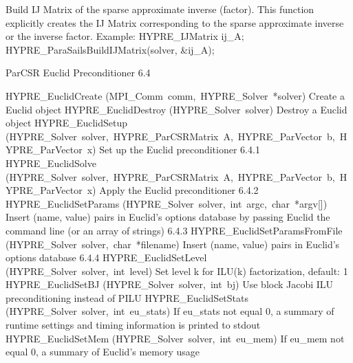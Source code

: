 \documentclass{article}
\begin{document}
\begin{cxxentry}
\begin{cxxentry}
\begin{cxxfunction}
\begin{cxxdoc}
Build IJ Matrix of the sparse approximate inverse (factor).
This function explicitly creates the IJ Matrix corresponding to 
the sparse approximate inverse or the inverse factor.
Example:  HYPRE\_IJMatrix ij\_A;
HYPRE\_ParaSailsBuildIJMatrix(solver, \&ij\_A);


\end{cxxdoc}
\end{cxxfunction}
\end{cxxentry}
\begin{cxxentry}
{}
        {ParCSR Euclid Preconditioner }
        {}
        {
}
        {6.4}
\begin{cxxnames}
        {HYPRE\_EuclidCreate}
        {(MPI\_Comm\ comm,\ HYPRE\_Solver\ *solver)}
        {
Create a Euclid object}
        {}
\label{cxx.6.4.7}
        {HYPRE\_EuclidDestroy}
        {(HYPRE\_Solver\ solver)}
        {
Destroy a Euclid object}
        {}
\label{cxx.6.4.8}
        {HYPRE\_EuclidSetup}
        {(HYPRE\_Solver\ solver,\ HYPRE\_ParCSRMatrix\ A,\ HYPRE\_ParVector\ b,\ HYPRE\_ParVector\ x)}
        {
Set up the Euclid preconditioner}
        {6.4.1}
        {HYPRE\_EuclidSolve}
        {(HYPRE\_Solver\ solver,\ HYPRE\_ParCSRMatrix\ A,\ HYPRE\_ParVector\ b,\ HYPRE\_ParVector\ x)}
        {
Apply the Euclid preconditioner}
        {6.4.2}
        {HYPRE\_EuclidSetParams}
        {(HYPRE\_Solver\ solver,\ int\ argc,\ char\ *argv[])}
        {
Insert (name, value) pairs in Euclid's options database
by passing Euclid the command line (or an array of strings)}
        {6.4.3}
        {HYPRE\_EuclidSetParamsFromFile}
        {(HYPRE\_Solver\ solver,\ char\ *filename)}
        {
Insert (name, value) pairs in Euclid's options database}
        {6.4.4}
        {HYPRE\_EuclidSetLevel}
        {(HYPRE\_Solver\ solver,\ int\ level)}
        {
Set level k for ILU(k) factorization, default: 1}
        {}
\label{cxx.6.4.9}
        {HYPRE\_EuclidSetBJ}
        {(HYPRE\_Solver\ solver,\ int\ bj)}
        {
Use block Jacobi ILU preconditioning instead of PILU}
        {}
\label{cxx.6.4.10}
        {HYPRE\_EuclidSetStats}
        {(HYPRE\_Solver\ solver,\ int\ eu\_stats)}
        {
If eu\_stats not equal 0, a summary of runtime settings and 
timing information is printed to stdout}
        {}
\label{cxx.6.4.11}
        {HYPRE\_EuclidSetMem}
        {(HYPRE\_Solver\ solver,\ int\ eu\_mem)}
        {
If eu\_mem not equal 0, a summary of Euclid's memory usage
}
\end{cxxnames}
\end{cxxentry}
\end{cxxentry}
\end{document}
